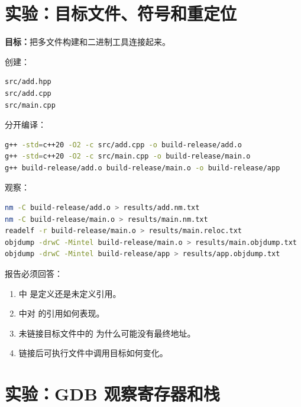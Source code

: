 \section{实验：目标文件、符号和重定位}

\begin{labbox}
\textbf{目标：}把多文件构建和二进制工具连接起来。

创建：

\begin{lstlisting}
src/add.hpp
src/add.cpp
src/main.cpp
\end{lstlisting}

分开编译：

\begin{lstlisting}[language=bash]
g++ -std=c++20 -O2 -c src/add.cpp -o build-release/add.o
g++ -std=c++20 -O2 -c src/main.cpp -o build-release/main.o
g++ build-release/add.o build-release/main.o -o build-release/app
\end{lstlisting}

观察：

\begin{lstlisting}[language=bash]
nm -C build-release/add.o > results/add.nm.txt
nm -C build-release/main.o > results/main.nm.txt
readelf -r build-release/main.o > results/main.reloc.txt
objdump -drwC -Mintel build-release/main.o > results/main.objdump.txt
objdump -drwC -Mintel build-release/app > results/app.objdump.txt
\end{lstlisting}

报告必须回答：

\begin{enumerate}
  \item {} 中  是定义还是未定义引用。
  \item {} 中对  的引用如何表现。
  \item 未链接目标文件中的  为什么可能没有最终地址。
  \item 链接后可执行文件中调用目标如何变化。
\end{enumerate}
\end{labbox}

\section{实验：GDB 观察寄存器和栈}

